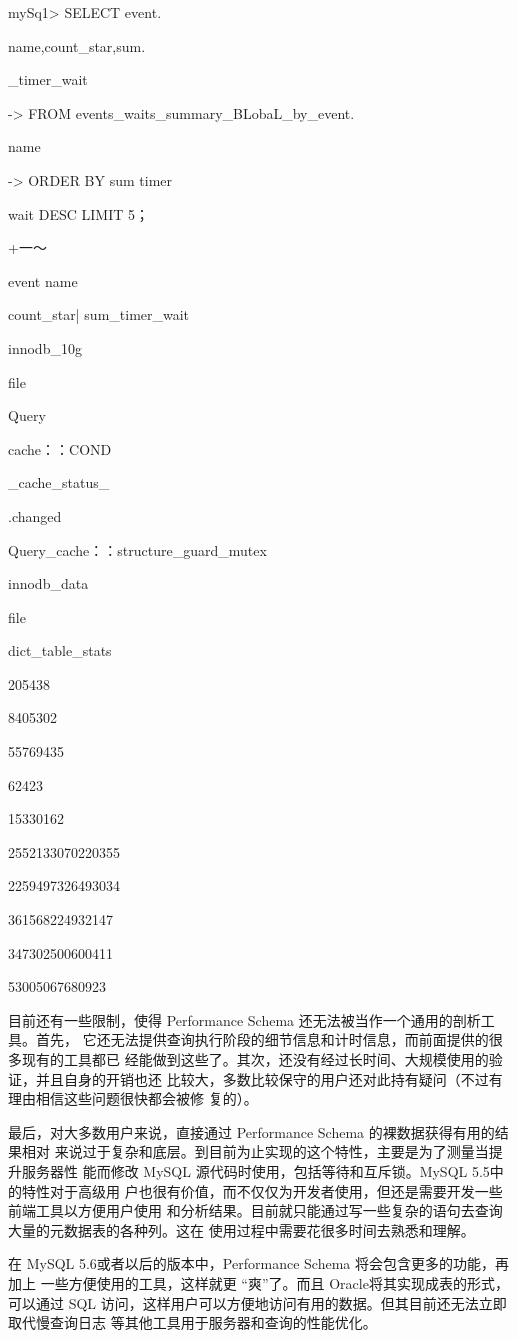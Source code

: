 {mySq1> SELECT event.

name,count\_star,sum.

\_timer\_wait

-> FROM events\_waits\_summary\_BLobaL\_by\_event.

name

-> ORDER BY sum timer

wait DESC LIMIT 5；

+一～

event name

count\_star| sum\_timer\_wait

innodb\_10g

file

Query

cache：：COND

\_cache\_status\_

.changed

Query\_cache：：structure\_guard\_mutex

innodb\_data

file

dict\_table\_stats

205438

8405302

55769435

62423

15330162

2552133070220355

2259497326493034

361568224932147

347302500600411

53005067680923

目前还有一些限制，使得 Performance Schema 还无法被当作一个通用的剖析工具。首先，
它还无法提供查询执行阶段的细节信息和计时信息，而前面提供的很多现有的工具都已
经能做到这些了。其次，还没有经过长时间、大规模使用的验证，并且自身的开销也还
比较大，多数比较保守的用户还对此持有疑问（不过有理由相信这些问题很快都会被修
复的）。

最后，对大多数用户来说，直接通过 Performance Schema 的裸数据获得有用的结果相对
来说过于复杂和底层。到目前为止实现的这个特性，主要是为了测量当提升服务器性
能而修改 MySQL 源代码时使用，包括等待和互斥锁。MySQL 5.5中的特性对于高级用
户也很有价值，而不仅仅为开发者使用，但还是需要开发一些前端工具以方便用户使用
和分析结果。目前就只能通过写一些复杂的语句去查询大量的元数据表的各种列。这在
使用过程中需要花很多时间去熟悉和理解。

在 MySQL 5.6或者以后的版本中，Performance Schema 将会包含更多的功能，再加上
一些方便使用的工具，这样就更 “爽”了。而且 Oracle将其实现成表的形式，可以通过
SQL 访问，这样用户可以方便地访问有用的数据。但其目前还无法立即取代慢查询日志
等其他工具用于服务器和查询的性能优化。

}
